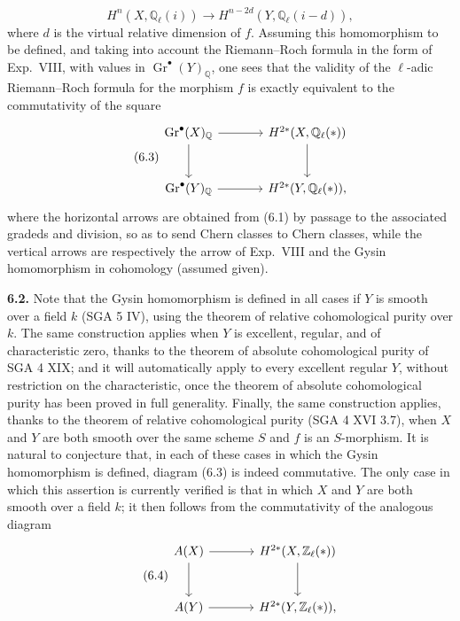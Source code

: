 \documentclass[11pt]{article}
\newcommand{\Q}{\mathbb Q}
\newcommand{\Zell}{\mathbb Z_{\ell}}
\newcommand{\Qell}{\mathbb Q_{\ell}}
\begin{document}
\begin{equation}\tag{6.2}
 H^n(X,\Qell(i))\longrightarrow H^{n-2d}(Y,\Qell(i-d)),
\end{equation}
where $d$ is the virtual relative dimension of $f$. Assuming this
homomorphism to be defined, and taking into account the Riemann--Roch formula
in the form of Exp.~VIII, with values in
$\operatorname{Gr}^\bullet(Y)_{\Q}$, one sees that the validity of the
$\ell$-adic Riemann--Roch formula for the morphism $f$ is exactly equivalent
to the commutativity of the square
\begin{equation}\tag{6.3}
\begin{tikzcd}[column sep=large,row sep=large]
 \operatorname{Gr}^\bullet(X)_{\Q} \arrow[r] \arrow[d]
   & H^{2*}(X,\Qell(*)) \arrow[d] \\
 \operatorname{Gr}^\bullet(Y)_{\Q} \arrow[r]
   & H^{2*}(Y,\Qell(*)),
\end{tikzcd}
\end{equation}
where the horizontal arrows are obtained from (6.1) by passage to the
associated gradeds and division, so as to send Chern classes to Chern
classes, while the vertical arrows are respectively the arrow of Exp.~VIII
and the Gysin homomorphism in cohomology (assumed given).

\noindent\textbf{6.2.}
Note that the Gysin homomorphism is defined in all cases if $Y$ is smooth
over a field $k$ (SGA 5 IV), using the theorem of relative cohomological
purity over $k$. The same construction applies when $Y$ is excellent,
regular, and of characteristic zero, thanks to the theorem of absolute
cohomological purity of SGA 4 XIX; and it will automatically apply to every
excellent regular $Y$, without restriction on the characteristic, once the
theorem of absolute cohomological purity has been proved in full generality.
Finally, the same construction applies, thanks to the theorem of relative
cohomological purity (SGA 4 XVI 3.7), when $X$ and $Y$ are both smooth over
the same scheme $S$ and $f$ is an $S$-morphism. It is natural to conjecture
that, in each of these cases in which the Gysin homomorphism is defined,
diagram (6.3) is indeed commutative. The only case in which this assertion
is currently verified is that in which $X$ and $Y$ are both smooth over a
field $k$; it then follows from the commutativity of the analogous diagram
\begin{equation}\tag{6.4}
\begin{tikzcd}[column sep=large,row sep=large]
 A(X) \arrow[r] \arrow[d]
   & H^{2*}(X,\Zell(*)) \arrow[d] \\
 A(Y) \arrow[r]
   & H^{2*}(Y,\Zell(*)),
\end{tikzcd}
\end{equation}
\end{document}
